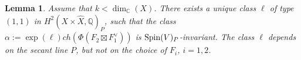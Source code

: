 \documentclass[12pt]{amsart}
\numberwithin{equation}{subsection}
\theoremstyle{plain}
\newtheorem{lem}[thm]{Lemma}
\theoremstyle{definition}
\newcommand{\CC}{{\mathbb C}}
\newcommand{\QQ}{{\mathbb Q}}
\newcommand{\Spin}{{\rm Spin}}
\begin{document}
\begin{lem}
\label{ch-3-alpha-is-second-partial-of-J}
Assume that $k<\dim_\CC(X)$. 
There exists a unique class $\ell$ of type $(1,1)$ in $H^2(X\times\hat{X},\QQ)_P$, such that 
the class $\alpha:=\exp(\ell)ch(\Phi(F_2\boxtimes F_1^\vee))$ is $\Spin(V)_P$-invariant. 
The class $\ell$ depends on the secant line $P$, but not on the choice of $F_i$, $i=1,2$.
\end{lem}
\end{document}

